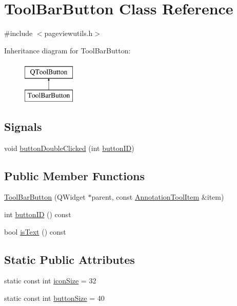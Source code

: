 \hypertarget{classToolBarButton}{\section{Tool\+Bar\+Button Class Reference}
\label{classToolBarButton}
}


{\ttfamily \#include $<$pageviewutils.\+h$>$}

Inheritance diagram for Tool\+Bar\+Button\+:\begin{figure}[H]
\begin{center}
\leavevmode
\includegraphics[height=2.000000cm]{classToolBarButton}
\end{center}
\end{figure}
\subsection*{Signals}
\begin{DoxyCompactItemize}
\item 
void \hyperlink{classToolBarButton_adecb0c3d3dcc600fe6f43204005e07b9}{button\+Double\+Clicked} (int \hyperlink{classToolBarButton_a750e0214f1132f48d15000f8537f8c73}{button\+I\+D})
\end{DoxyCompactItemize}
\subsection*{Public Member Functions}
\begin{DoxyCompactItemize}
\item 
\hyperlink{classToolBarButton_a7a8fc00f72c150a3338f269854e21e1f}{Tool\+Bar\+Button} (Q\+Widget $\ast$parent, const \hyperlink{structAnnotationToolItem}{Annotation\+Tool\+Item} \&item)
\item 
int \hyperlink{classToolBarButton_a750e0214f1132f48d15000f8537f8c73}{button\+I\+D} () const 
\item 
bool \hyperlink{classToolBarButton_a9dee09e548ce48d260a3ba4d217cebf7}{is\+Text} () const 
\end{DoxyCompactItemize}
\subsection*{Static Public Attributes}
\begin{DoxyCompactItemize}
\item 
static const int \hyperlink{classToolBarButton_af20cb74ef4ee4e049fd8bb18619106fa}{icon\+Size} = 32
\item 
static const int \hyperlink{classToolBarButton_a124410faa69251b2a84d7ab039d6670d}{button\+Size} = 40
\end{DoxyCompactItemize}

